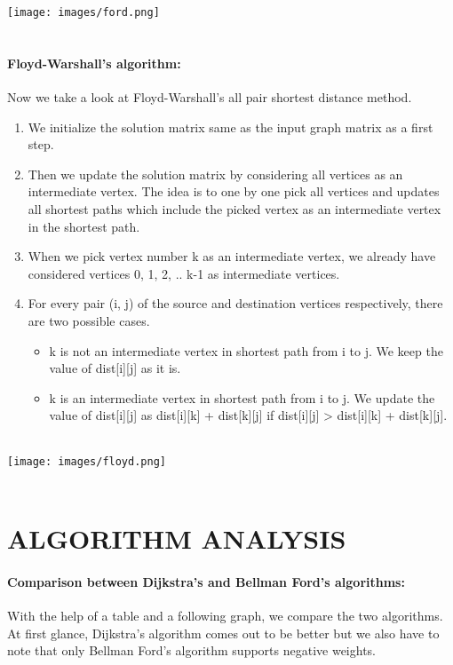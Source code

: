 \documentclass[10pt]{article}
\begin{document}
\begin{multicols*}{2}
\begin{enumerate}
\end{enumerate}

\texttt{[image: images/ford.png]}\\\\

\paragraph{Floyd-Warshall's algorithm:}
Now we take a look at Floyd-Warshall's all pair shortest distance method.

\begin{enumerate}
    \item We initialize the solution matrix same as  the input graph matrix as a first step.
    \item Then we update the solution matrix by  considering all vertices as an  
intermediate vertex. The idea is to one by  one pick all vertices and updates all  shortest paths which include the picked  vertex as an intermediate vertex in the  shortest path. 
\item When we pick vertex number k as an  intermediate vertex, we already have  considered vertices {0, 1, 2, .. k-1} as  intermediate vertices.
\item For every pair (i, j) of the source and  destination vertices respectively, there  are two possible cases.
\begin{itemize}
    \item k is not an intermediate vertex in  shortest path from i to j. We keep the value of dist[i][j] as it is.
    \item k is an intermediate vertex in shortest path from i to j. We update the value of dist[i][j] as dist[i][k] + dist[k][j] if dist[i][j] > dist[i][k] + dist[k][j]. \\\\
\end{itemize}

\end{enumerate}
\texttt{[image: images/floyd.png]}\\\\

    

	
\section*{ALGORITHM ANALYSIS} 

\paragraph{Comparison between Dijkstra's and Bellman Ford's algorithms: }
With the help of a table and a following graph, we compare the two algorithms. At first glance, Dijkstra's algorithm comes out to be better but we also have to note that only Bellman Ford's algorithm supports negative weights.\\\\


\end{multicols*}
\end{document}
